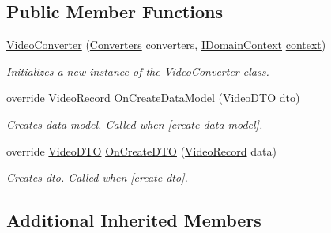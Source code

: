 \subsection*{Public Member Functions}
\begin{DoxyCompactItemize}
\item 
\mbox{\hyperlink{class_bar_none_1_1_shared_1_1_data_converter_1_1_lift_1_1_video_converter_afc4428e83f194730d07decd293f3e334}{Video\+Converter}} (\mbox{\hyperlink{class_bar_none_1_1_shared_1_1_data_converters_1_1_converters}{Converters}} converters, \mbox{\hyperlink{interface_bar_none_1_1_shared_1_1_core_1_1_i_domain_context}{I\+Domain\+Context}} \mbox{\hyperlink{class_bar_none_1_1_shared_1_1_data_converter_1_1_core_1_1_base_data_converter_ae96bc28386162a9cff2a303c270a12b4}{context}})
\begin{DoxyCompactList}\small\item\em Initializes a new instance of the \mbox{\hyperlink{class_bar_none_1_1_shared_1_1_data_converter_1_1_lift_1_1_video_converter}{Video\+Converter}} class. \end{DoxyCompactList}\item 
override \mbox{\hyperlink{class_bar_none_1_1_shared_1_1_domain_model_1_1_video_record}{Video\+Record}} \mbox{\hyperlink{class_bar_none_1_1_shared_1_1_data_converter_1_1_lift_1_1_video_converter_aef746484961e0bfd80d8a0efb3180cc3}{On\+Create\+Data\+Model}} (\mbox{\hyperlink{class_bar_none_1_1_shared_1_1_data_transfer_1_1_video_d_t_o}{Video\+D\+TO}} dto)
\begin{DoxyCompactList}\small\item\em Creates data model. Called when \mbox{[}create data model\mbox{]}. \end{DoxyCompactList}\item 
override \mbox{\hyperlink{class_bar_none_1_1_shared_1_1_data_transfer_1_1_video_d_t_o}{Video\+D\+TO}} \mbox{\hyperlink{class_bar_none_1_1_shared_1_1_data_converter_1_1_lift_1_1_video_converter_a266dd519c2c93b0863378b65c1004c4f}{On\+Create\+D\+TO}} (\mbox{\hyperlink{class_bar_none_1_1_shared_1_1_domain_model_1_1_video_record}{Video\+Record}} data)
\begin{DoxyCompactList}\small\item\em Creates dto. Called when \mbox{[}create dto\mbox{]}. \end{DoxyCompactList}\end{DoxyCompactItemize}
\subsection*{Additional Inherited Members}


